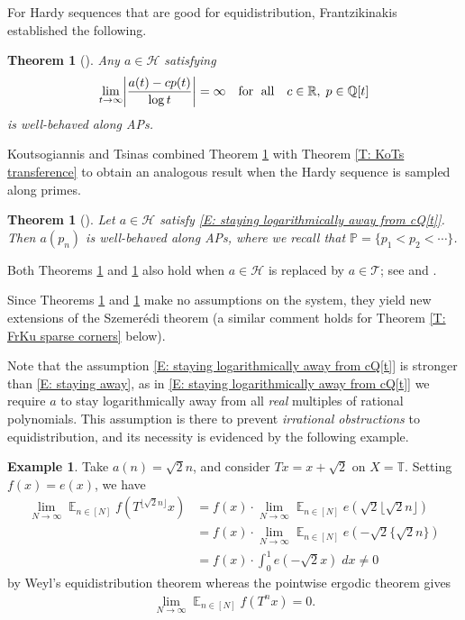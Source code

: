 \documentclass[11pt]{amsart}
\newtheorem{theorem}[lemma]{Theorem}
\theoremstyle{definition}
\newtheorem{example}[lemma]{Example}
\DeclareMathOperator*{\E}{\mathbb{E}}
\renewcommand{\P}{{\mathbb P}}
\newcommand{\Q}{{\mathbb Q}}
\newcommand{\R}{{\mathbb R}}
\newcommand{\T}{{\mathbb T}}
\newcommand{\CH}{{\mathcal H}}
\newcommand{\CT}{{\mathcal T}}
\newcommand{\CX}{{\mathcal X}}
\newcommand{\1}{{\mathbf{1}}}
\newcommand{\abs}[1]{\mathopen{}\left| #1\mathclose{}\right|}
\newcommand{\sfloor}[1]{{\lfloor #1 \rfloor}}
\newcommand{\srem}[1]{ \{ #1 \}}
\begin{document}
For Hardy sequences that are good for equidistribution, Frantzikinakis established the following.
\begin{theorem}[{\cite[Theorem 2.2]{Fr10}}]\label{T: Fr Hardy along APs}
    Any $a\in\CH$ satisfying
    \begin{align}\label{E: staying logarithmically away from cQ[t]}
        \lim_{t\to\infty}\abs{\frac{a(t) - c p(t)}{\log t}} = \infty\quad \textrm{for\; all}\quad c\in\R,\; p\in\Q[t]
    \end{align}
    is well-behaved along APs.
\end{theorem}
Koutsogiannis and Tsinas combined Theorem \ref{T: Fr Hardy along APs} with Theorem \ref{T: KoTs transference} to obtain an analogous result when the Hardy sequence is sampled along primes.
\begin{theorem}[{\cite[Theorem 1.3]{KoTs23}}]\label{T: KoTs Hardy along APs}
    Let $a\in\CH$ satisfy \eqref{E: staying logarithmically away from cQ[t]}. Then $a(p_n)$ is well-behaved along APs, where we recall that $\P = \{p_1<p_2<\cdots\}$.
\end{theorem}
Both Theorems \ref{T: Fr Hardy along APs} and \ref{T: KoTs Hardy along APs} also hold when $a\in\CH$ is replaced by $a\in\CT$; see \cite[Section 2.1.5]{Fr10} and \cite[Theorem 7.4]{KoTs23}.

Since Theorems \ref{T: Fr Hardy along APs} and \ref{T: KoTs Hardy along APs} make no assumptions on the system, they yield new extensions of the Szemer\'edi theorem (a similar comment holds for Theorem \ref{T: FrKu sparse corners} below).

Note that the assumption \eqref{E: staying logarithmically away from cQ[t]} is stronger than \eqref{E: staying away}, as in \eqref{E: staying logarithmically away from cQ[t]} we require $a$ to stay logarithmically away from all \emph{real} multiples of rational polynomials. This assumption is there to prevent \emph{irrational obstructions} to equidistribution, and its necessity is evidenced by the following example.
\begin{example}\label{Ex: sqrt 2 n}
    Take $a(n) = \sqrt{2}n$, and consider $Tx = x+\sqrt{2}$ on $X=\T$. Setting $f(x) = e(x)$, we have
    \begin{align*}
        \lim_{N\to\infty}\E_{n\in[N]}f(T^{\sfloor{\sqrt{2}n}}x) &= f(x)\cdot\lim_{N\to\infty}\E_{n\in[N]}e(\sqrt{2}\sfloor{\sqrt{2}n})\\
        &= f(x)\cdot\lim_{N\to\infty}\E_{n\in[N]}e(-\sqrt{2}\srem{\sqrt{2}n})\\
        &= f(x)\cdot\int_0^1 e(-\sqrt{2}x)\;dx \neq 0
    \end{align*}
    by Weyl's equidistribution theorem whereas the pointwise ergodic theorem gives
    \begin{align*}
        \lim_{N\to\infty}\E_{n\in[N]}f(T^n x) = 0.
    \end{align*}
\end{example}
\end{document}
